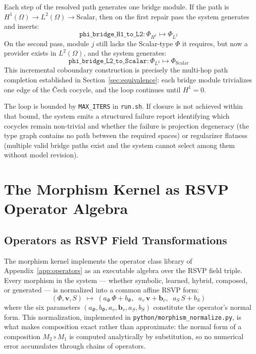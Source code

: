 \documentclass[12pt, oneside]{article}
\begin{document}
Each step of the resolved path generates one bridge module. If the path is
$H^1(\Omega) \to L^2(\Omega) \to \mathrm{Scalar}$, then on the first repair pass the
system generates and inserts:
\[
\texttt{phi\_bridge\_H1\_to\_L2} : \Phi_{H^1} \mapsto \Phi_{L^2}
\]
On the second pass, module $j$ still lacks the Scalar-type $\Phi$ it requires, but
now a provider exists in $L^2(\Omega)$, and the system generates:
\[
\texttt{phi\_bridge\_L2\_to\_Scalar} : \Phi_{L^2} \mapsto \Phi_{\mathrm{Scalar}}
\]
This incremental coboundary construction is precisely the multi-hop path completion
established in Section~\ref{sec:equivalence}: each bridge module trivializes one edge
of the \v{C}ech cocycle, and the loop continues until $H^1 = 0$.

The loop is bounded by \texttt{MAX\_ITERS} in \texttt{run.sh}. If closure is not
achieved within that bound, the system emits a structured failure report identifying
which cocycles remain non-trivial and whether the failure is projection degeneracy
(the type graph contains no path between the required spaces) or regularizer flatness
(multiple valid bridge paths exist and the system cannot select among them without
model revision).

\section{The Morphism Kernel as RSVP Operator Algebra}
\label{app:morphism_kernel}

\subsection{Operators as RSVP Field Transformations}

The morphism kernel implements the operator class library of Appendix~\ref{app:operators}
as an executable algebra over the RSVP field triple. Every morphism in the system ---
whether symbolic, learned, hybrid, composed, or generated --- is normalized into a
common affine RSVP form:
\[
(\Phi, \mathbf{v}, S) \;\mapsto\;
(a_\Phi\, \Phi + b_\Phi,\;\; a_v\, \mathbf{v} + \mathbf{b}_v,\;\; a_S\, S + b_S)
\]
where the six parameters $(a_\Phi, b_\Phi, a_v, \mathbf{b}_v, a_S, b_S)$ constitute the
operator's normal form. This normalization, implemented in \texttt{python/morphism\_normalize.py},
is what makes composition exact rather than approximate: the normal form of a composition
$M_2 \circ M_1$ is computed analytically by substitution, so no numerical error
accumulates through chains of operators.
\end{document}
